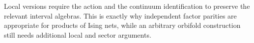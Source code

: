 Local versions require the action and the continuum identification to
preserve the relevant interval algebras. This is exactly why independent
factor parities are appropriate for products of Ising nets, while an arbitrary
orbifold construction still needs additional local and sector arguments.

